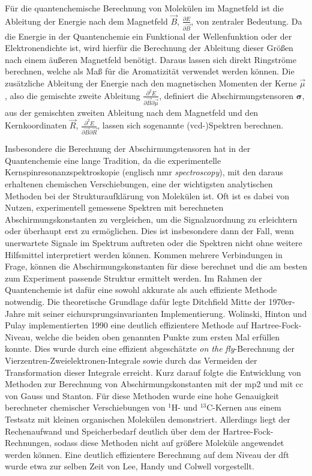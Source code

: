 Für die quantenchemische Berechnung von Molekülen im Magnetfeld ist die Ableitung der Energie nach dem Magnetfeld $\vec{B}$, $\frac{\partial E}{\partial \vec{B}}$, von zentraler Bedeutung. Da die Energie in der Quantenchemie ein Funktional der Wellenfunktion oder der Elektronendichte ist, wird hierfür die Berechnung der Ableitung dieser Größen nach einem äußeren Magnetfeld benötigt. Daraus lassen sich direkt Ringströme berechnen, welche als Maß für die Aromatizität verwendet werden können. Die zusätzliche Ableitung der Energie nach den magnetischen Momenten der Kerne $\vec{\mu}$, also die gemischte zweite Ableitung $\frac{\partial^2 E}{\partial \vec{B}\partial\vec{\mu}}$, definiert die Abschirmungstensoren $\boldsymbol{\sigma}$, aus der gemischten zweiten Ableitung nach dem Magnetfeld und den Kernkoordinaten $\vec{R}$, $\frac{\partial^2 E}{\partial \vec{B}\partial \vec{R}}$, lassen sich sogenannte \mbox{(\acs{vcd}-)}Spektren berechnen. 

Insbesondere die Berechnung der Abschirmungstensoren hat in der Quantenchemie eine lange Tradition, da die experimentelle Kernspinresonanzspektroskopie (englisch \ac{nmr} \textit{spectroscopy}), mit den daraus erhaltenen chemischen Verschiebungen, eine der wichtigsten analytischen Methoden bei der Strukturaufklärung von Molekülen ist. Oft ist es dabei von Nutzen, experimentell gemessene Spektren mit berechneten Abschirmungskonstanten zu vergleichen, um die Signalzuordnung zu erleichtern oder überhaupt erst zu ermöglichen. Dies ist insbesondere dann der Fall, wenn unerwartete Signale im Spektrum auftreten oder die Spektren nicht ohne weitere Hilfsmittel interpretiert werden können. Kommen mehrere Verbindungen in Frage, können die Abschirmungskonstanten für diese berechnet und die am besten zum Experiment passende Struktur ermittelt werden. Im Rahmen der Quantenchemie ist dafür eine sowohl akkurate als auch effiziente Methode notwendig. Die theoretische Grundlage dafür legte Ditchfield\supercite{ditchfield1974self} Mitte der 1970er-Jahre mit seiner eichursprungsinvarianten Implementierung. Wolinski, Hinton und Pulay\supercite{wolinski1990efficient} implementierten 1990 eine deutlich effizientere Methode auf Hartree-Fock-Niveau, welche die beiden oben genannten Punkte zum ersten Mal erfüllen konnte. Dies wurde durch eine effizient abgeschätzte \glqq \textit{on the fly}\grqq{}-Berechnung der Vierzentren-Zweielektronen-Integrale sowie durch das Vermeiden der Transformation dieser Integrale erreicht. Kurz darauf folgte die Entwicklung von Methoden zur Berechnung von Abschirmungskonstanten mit der \ac{mp2}\supercite{gauss1992calculation} und mit \ac{cc}\supercite{gauss1995gauge} von Gauss und Stanton. Für diese Methoden wurde eine hohe Genauigkeit berechneter chemischer Verschiebungen von $^1$H- und $^{13}$C-Kernen aus einem Testsatz mit kleinen organischen Molekülen demonstriert. Allerdings liegt der Rechenaufwand und Speicherbedarf deutlich über dem der Hartree-Fock-Rechnungen, sodass diese Methoden nicht auf größere Moleküle angewendet werden können. Eine deutlich effizientere Berechnung auf dem Niveau der \ac{dft} wurde etwa zur selben Zeit von Lee, Handy und Colwell\supercite{lee1995density} vorgestellt. 

